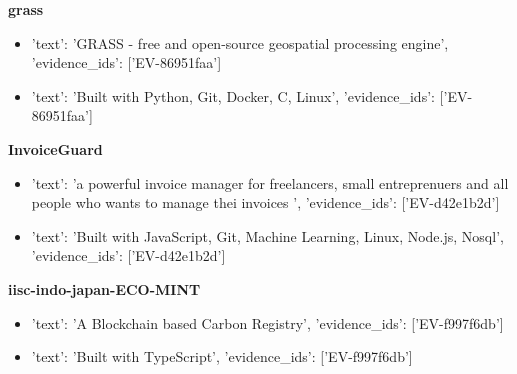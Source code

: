 \documentclass[10pt, letterpaper]{article}
\begin{document}
    \vspace{4pt}

    \textbf{\color{primary} grass}  \\
    
    
    \begin{itemize}
    
        \item {'text': 'GRASS - free and open-source geospatial processing engine', 'evidence_ids': ['EV-86951faa']}
    
        \item {'text': 'Built with Python, Git, Docker, C, Linux', 'evidence_ids': ['EV-86951faa']}
    
    \end{itemize}
    
    \vspace{4pt}

    \textbf{\color{primary} InvoiceGuard}  \\
    
    
    \begin{itemize}
    
        \item {'text': 'a powerful invoice manager for freelancers, small entreprenuers and all people who wants to manage thei invoices ', 'evidence_ids': ['EV-d42e1b2d']}
    
        \item {'text': 'Built with JavaScript, Git, Machine Learning, Linux, Node.js, Nosql', 'evidence_ids': ['EV-d42e1b2d']}
    
    \end{itemize}
    
    \vspace{4pt}

    \textbf{\color{primary} iisc-indo-japan-ECO-MINT}  \\
    
    
    \begin{itemize}
    
        \item {'text': 'A Blockchain based Carbon Registry', 'evidence_ids': ['EV-f997f6db']}
    
        \item {'text': 'Built with TypeScript', 'evidence_ids': ['EV-f997f6db']}
    
    \end{itemize}
    
    \vspace{4pt}
\end{document}
